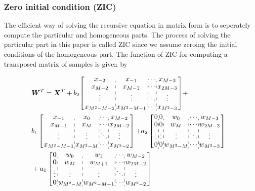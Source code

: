 \subsubsection{Zero initial condition (ZIC)}

The efficient way of solving the recursive equation in matrix form is to seperately compute
the particular and homogeneous parts. The process of solving the particular part in this paper is called
ZIC since we assume zeroing the initial conditions of the homogeneous part. 
The function of ZIC for computing a transposed matrix of samples is given by

\begin{equation}
    \label{eq:ZIC}
    \begin{aligned}
        &\bm{W}^T = \bm{X}^T 
        + b_2{\left[\arraycolsep=0.9pt\def\arraystretch{0.9}
        \begin{array}{c:c:c:c}
        x_{-2} & x_{-1} & \cdots & x_{M-3} \\ 
        x_{M-2} & x_{M-1} & \cdots & x_{2M-3} \\
        \vdots & \vdots & \ddots & \vdots \\
        x_{M^2-M-2} & x_{M^2-M-1} & \cdots & x_{M^2-3} \\
        \end{array}\right]} + \\ 
        & b_1\left[\arraycolsep=0.9pt\def\arraystretch{0.9}
        \begin{array}{c:c:c:c}
        x_{-1} & x_0 & \cdots & x_{M-2} \\ 
        x_{M-1} & x_M & \cdots & x_{2M-2} \\
        \vdots & \vdots & \ddots & \vdots \\
        x_{M^2-M-1} & x_{M^2-M} & \cdots & x_{M^2-2} \\
        \end{array}\right]
        {+} a_2\left[\arraycolsep=0.9pt\def\arraystretch{0.9}
                \begin{array}{c:c:c:c:c}
                0 & 0 & w_0 & \cdots & w_{M-3} \\ 
                0 & 0 & w_M & \cdots & w_{2M-3} \\
                \vdots & \vdots & \vdots & \ddots & \vdots \\
                0 & 0 & w_{M^2-M} & \cdots & w_{M^2-3} \\
                \end{array}\right] \\
        &+ a_1\left[\arraycolsep=0.9pt\def\arraystretch{0.9}
            \begin{array}{c:c:c:c:c}
            0 & w_0 & w_1 & \cdots & w_{M-2} \\ 
            0 & w_M & w_{M+1} & \cdots & w_{2M-2} \\
            \vdots & \vdots & \vdots & \ddots & \vdots \\
            0 & w_{M^2-M} & w_{M^2-M+1} & \cdots & w_{M^2-2} \\
            \end{array}\right]
    \end{aligned}
\end{equation}
